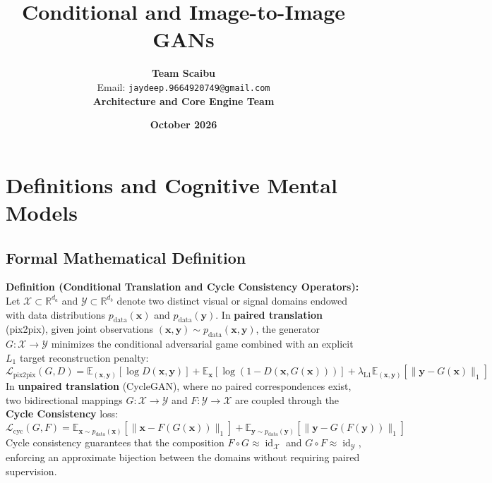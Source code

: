 \documentclass[11pt,a4paper]{article}
\title{\textbf{Conditional and Image-to-Image GANs}}
\author{\textbf{Team Scaibu} \\ \small Email: \texttt{jaydeep.9664920749@gmail.com} \\ \small \textbf{Architecture and Core Engine Team}}
\date{\textbf{October 2026}}
\theoremstyle{definition}
\begin{document}
\maketitle

\section{Definitions and Cognitive Mental Models}

\subsection{Formal Mathematical Definition}
\textbf{Definition (Conditional Translation and Cycle Consistency Operators):}
Let $\mathcal{X} \subset \mathbb{R}^{d_a}$ and $\mathcal{Y} \subset \mathbb{R}^{d_b}$ denote two distinct visual or signal domains endowed with data distributions $p_{\text{data}}(\mathbf{x})$ and $p_{\text{data}}(\mathbf{y})$. In \textbf{paired translation} (pix2pix), given joint observations $(\mathbf{x}, \mathbf{y}) \sim p_{\text{data}}(\mathbf{x}, \mathbf{y})$, the generator $G: \mathcal{X} \to \mathcal{Y}$ minimizes the conditional adversarial game combined with an explicit $L_1$ target reconstruction penalty:
{\boldmath
\begin{equation}
\mathcal{L}_{\text{pix2pix}}(G, D) = \mathbb{E}_{(\mathbf{x}, \mathbf{y})}\left[ \log D(\mathbf{x}, \mathbf{y}) \right] + \mathbb{E}_{\mathbf{x}}\left[ \log(1 - D(\mathbf{x}, G(\mathbf{x}))) \right] + \lambda_{\text{L1}} \mathbb{E}_{(\mathbf{x}, \mathbf{y})}\left[ \|\mathbf{y} - G(\mathbf{x})\|_1 \right]
\end{equation}
}
In \textbf{unpaired translation} (CycleGAN), where no paired correspondences exist, two bidirectional mappings $G: \mathcal{X} \to \mathcal{Y}$ and $F: \mathcal{Y} \to \mathcal{X}$ are coupled through the \textbf{Cycle Consistency} loss:
{\boldmath
\begin{equation}
\mathcal{L}_{\text{cyc}}(G, F) = \mathbb{E}_{\mathbf{x} \sim p_{\text{data}}(\mathbf{x})}\left[ \|\mathbf{x} - F(G(\mathbf{x}))\|_1 \right] + \mathbb{E}_{\mathbf{y} \sim p_{\text{data}}(\mathbf{y})}\left[ \|\mathbf{y} - G(F(\mathbf{y}))\|_1 \right]
\end{equation}
}
Cycle consistency guarantees that the composition $F \circ G \approx \operatorname{id}_{\mathcal{X}}$ and $G \circ F \approx \operatorname{id}_{\mathcal{Y}}$, enforcing an approximate bijection between the domains without requiring paired supervision.
\end{document}
